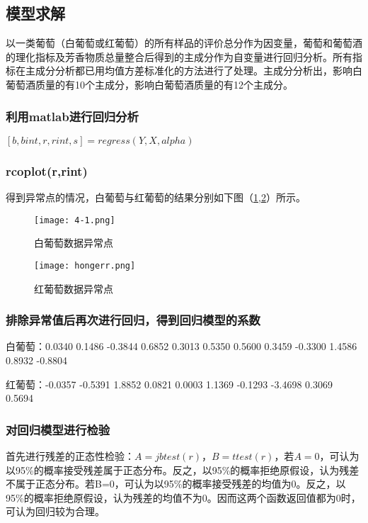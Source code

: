 \documentclass[withoutpreface,bwprint]{cumcmthesis} %
\begin{document}
\subsection{模型求解}
\par 以一类葡萄（白葡萄或红葡萄）的所有样品的评价总分作为因变量，葡萄和葡萄酒的理化指标及芳香物质总量整合后得到的主成分作为自变量进行回归分析。所有指标在主成分分析都已用均值方差标准化的方法进行了处理。主成分分析出，影响白葡萄酒质量的有10个主成分，影响白葡萄酒质量的有12个主成分。

\subsubsection{利用matlab进行回归分析}
 \par $[b,bint,r,rint,s]=regress(Y,X,alpha)$

\subsubsection{rcoplot(r,rint)}
\par 得到异常点的情况，白葡萄与红葡萄的结果分别如下图（\ref{白葡萄数据异常点},\ref{红葡萄数据异常点}）所示。
\begin{figure}[htbp]
\centering
\texttt{[image: 4-1.png]}
\caption{白葡萄数据异常点}
\label{白葡萄数据异常点}
\end{figure}
\begin{figure}[htbp]
\centering
\texttt{[image: hongerr.png]}
\caption{红葡萄数据异常点}
\label{红葡萄数据异常点}
\end{figure}

\subsubsection{排除异常值后再次进行回归，得到回归模型的系数}
\par 白葡萄：0.0340    0.1486   -0.3844    0.6852    0.3013    0.5350    0.5600    0.3459   -0.3300    1.4586    0.8932   -0.8804
\par 红葡萄：-0.0357   -0.5391    1.8852    0.0821    0.0003    1.1369   -0.1293   -3.4698    0.3069    0.5694

\subsubsection{对回归模型进行检验}
\par 首先进行残差的正态性检验：$A=jbtest(r)$，$B=ttest(r)$，若$A=0$，可认为以95\%的概率接受残差属于正态分布。反之，以95\%的概率拒绝原假设，认为残差不属于正态分布。若B=0，可认为以95\%的概率接受残差的均值为0。反之，以95\%的概率拒绝原假设，认为残差的均值不为0。因而这两个函数返回值都为0时，可认为回归较为合理。
\end{document}
